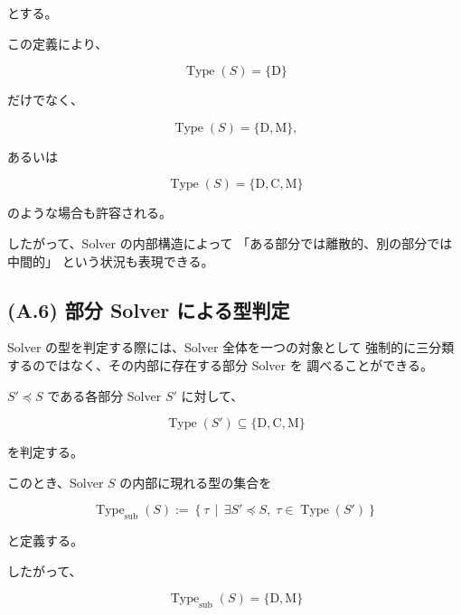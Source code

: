 \documentclass[a4paper,11pt]{article}
\newcommand{\SubSolver}{\preceq}
\newcommand{\Type}{\operatorname{Type}}
\newcommand{\DType}{\mathrm{D}}
\newcommand{\CType}{\mathrm{C}}
\newcommand{\MType}{\mathrm{M}}
\begin{document}
とする。

この定義により、

\begin{equation}
    \Type(S)=\{\DType\}
\end{equation}

だけでなく、

\begin{equation}
    \Type(S)=\{\DType,\MType\},
\end{equation}

あるいは

\begin{equation}
    \Type(S)
    =
    \{\DType,\CType,\MType\}
\end{equation}

のような場合も許容される。

したがって、Solver の内部構造によって
「ある部分では離散的、別の部分では中間的」
という状況も表現できる。


\subsection{(A.6) 部分 Solver による型判定}
\label{subsec:A6}

Solver の型を判定する際には、Solver 全体を一つの対象として
強制的に三分類するのではなく、その内部に存在する部分 Solver を
調べることができる。

$S'\SubSolver S$ である各部分 Solver $S'$ に対して、

\begin{equation}
    \Type(S')
    \subseteq
    \{\DType,\CType,\MType\}
\end{equation}

を判定する。

このとき、Solver $S$ の内部に現れる型の集合を

\begin{equation}
    \boxed{
        \Type_{\mathrm{sub}}(S)
        :=
        \left\{
            \tau
            \,\middle|\,
            \exists S'\SubSolver S,\;
            \tau\in\Type(S')
        \right\}
    }
    \label{eq:A-subsolver-type-set}
\end{equation}

と定義する。

したがって、

\begin{equation}
    \Type_{\mathrm{sub}}(S)
    =
    \{\DType,\MType\}
\end{equation}
\end{document}
